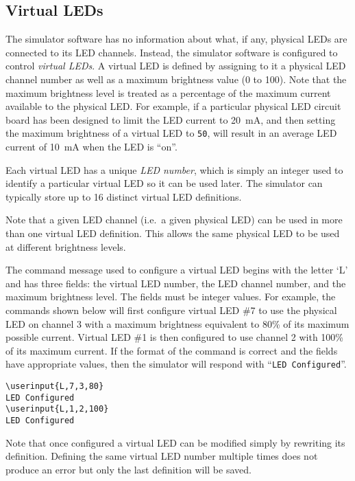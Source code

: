 \documentclass[letterpaper,11pt]{article}
\newcommand\userinput[1]{\textbf{#1}}
\begin{document}
\subsection*{Virtual LEDs}

The simulator software has no information about what, if any, physical LEDs are
connected to its LED channels. Instead, the simulator software is configured to
control \textit{virtual LEDs}. A virtual LED is defined by assigning to it a
physical LED channel number as well as a maximum brightness value (0 to 100).
Note that the maximum brightness level is treated as a percentage of the
maximum current available to the physical LED. For example, if a particular
physical LED circuit board has been designed to limit the LED current to
\SI{20}{\milli\ampere}, and then setting the maximum brightness of a virtual
LED to \texttt{50}, will result in an average LED current of
\SI{10}{\milli\ampere} when the LED is ``on''.

Each virtual LED has a unique \textit{LED number}, which is simply an integer
used to identify a particular virtual LED so it can be used later. The
simulator can typically store up to 16 distinct virtual LED definitions.

Note that a given LED channel (i.e.\ a given physical LED) can be used in more
than one virtual LED definition. This allows the same physical LED to be used
at different brightness levels.

The command message used to configure a virtual LED begins with the letter `L'
and has three fields: the virtual LED number, the LED channel number, and the
maximum brightness level. The fields must be integer values. For example, the
commands shown below will first configure virtual LED \#7 to use the physical
LED on channel 3 with a maximum brightness equivalent to 80\% of its maximum
possible current. Virtual LED \#1 is then configured to use channel 2 with
100\% of its maximum current. If the format of the command is correct and the
fields have appropriate values, then the simulator will respond with
``\texttt{LED Configured}''. 

\begin{tcolorbox}
\begin{Verbatim}[commandchars=\\\{\}]
\userinput{L,7,3,80}
LED Configured
\userinput{L,1,2,100}
LED Configured
\end{Verbatim}
\end{tcolorbox}

Note that once configured a virtual LED can be modified simply by rewriting
its definition. Defining the same virtual LED number multiple times does not
produce an error but only the last definition will be saved.
\end{document}
